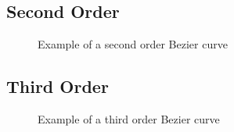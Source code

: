 \documentclass[a5paper,12pt]{book}
\begin{document}
\subsection{Second Order}
\begin{figure}[h]
    \centering
    
    \caption{Example of a second order Bezier curve} \label{fig:example-second}
\end{figure}
\subsection{Third Order}
\begin{figure}[h]
    \centering
    
    \caption{Example of a third order Bezier curve} \label{fig:example-third}
\end{figure}
\clearpage
{}
\printindex
\end{document}
